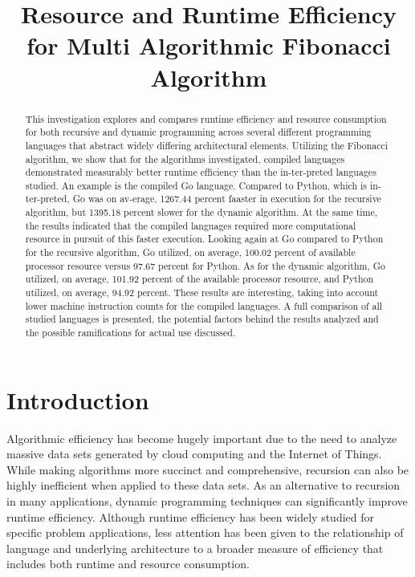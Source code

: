 \documentclass{sig-alternate}
\title{Resource and Runtime Efficiency for Multi Algorithmic Fibonacci Algorithm}
\author{}
\begin{document}
\maketitle
\thispagestyle{firstpage}
\pagestyle{plain}




\begin{abstract}

This investigation explores and compares runtime efficiency and resource consumption 
for both recursive and dynamic programming across several different programming languages that abstract widely differing architectural elements. Utilizing the Fibonacci algorithm, we show that for the algorithms investigated, compiled languages demonstrated measurably better runtime efficiency than the in-ter-preted languages studied. An example is the compiled Go language. Compared to Python, which is in-ter-preted, Go was on av-erage, 1267.44 percent faaster in execution for the recursive algorithm, but 1395.18 percent slower for the dynamic algorithm. At the same time, the results indicated that the compiled languages required more computational resource in pursuit of this faster execution. Looking again at Go compared to Python for the recursive algorithm, Go utilized, on average, 100.02 percent of available processor resource versus 97.67 percent for Python. As for the dynamic algorithm, Go utilized, on average, 101.92 percent of the available processor resource, and Python utilized, on average, 94.92 percent. These results are interesting, taking into account lower machine instruction counts for the compiled languages. A full comparison of all studied languages is presented, the potential factors behind the results analyzed and the possible ramifications for actual use discussed.

\end{abstract}

\section{Introduction}
Algorithmic efficiency has become hugely important due to the need to analyze massive data sets generated by cloud computing and the Internet of Things. While making algorithms more succinct and comprehensive, recursion can also be highly inefficient when applied to these data sets. As an alternative to recursion in many applications, dynamic programming techniques can significantly improve runtime efficiency. Although runtime efficiency has been widely studied for specific problem applications, less attention has been given to the relationship of language and underlying architecture to a broader measure of efficiency that includes both runtime and resource consumption.
\end{document}
